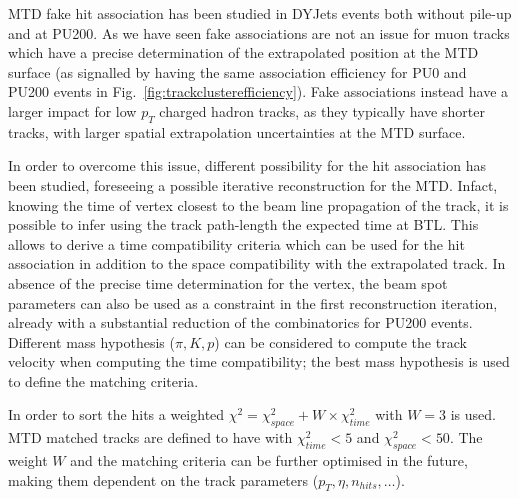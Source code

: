MTD fake hit association has been studied in DYJets events both without pile-up and at PU200. As we have seen fake associations are not an issue for muon tracks which have a precise determination of the extrapolated position at the MTD surface (as signalled by having the same association efficiency for PU0 and PU200 events in Fig.~\ref{fig:trackclusterefficiency}). Fake associations instead have a larger impact for low $p_{T}$ charged hadron tracks, as they typically have shorter tracks, with larger spatial extrapolation uncertainties at the MTD surface.


In order to overcome this issue, different possibility for the hit association has been studied, foreseeing a possible iterative reconstruction for the MTD. Infact, knowing the time of vertex closest to the beam line propagation of the track, it is possible to infer using the track path-length the expected time at BTL. This allows to derive a time compatibility criteria which can be used for the hit association in addition to the space compatibility with the extrapolated track. In absence of the precise time determination for the vertex, the beam spot parameters can also be used as a constraint in the first reconstruction iteration, already with a substantial reduction of the combinatorics for PU200 events. Different mass hypothesis ($\pi,K,p$) can be considered to compute the track velocity when computing the time compatibility; the best mass hypothesis is used to define the matching criteria. 

In order to sort the hits a weighted $\chi^2=\chi^2_{space}+W\times\chi^2_{time}$ with $W=3$ is used. MTD matched tracks are defined to have with $\chi^2_{time}<5$ and  $\chi^2_{space}<50$. The weight $W$ and the matching criteria can be further optimised in the future, making them dependent on the track parameters ($p_{T},\eta,n_{hits},\dots$).  

